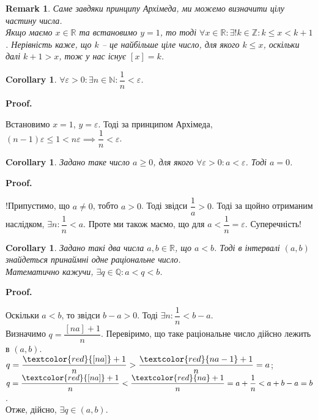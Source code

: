\documentclass[a4paper, 14pt]{article}
\makeatletter
\def\qed{$\blacksquare$}
\theoremstyle{theoremdd}
\theoremstyle{theoremdd}
\theoremstyle{theoremdd}
\theoremstyle{theoremdd}
\theoremstyle{theoremdd}
\theoremstyle{theoremdd}
\newtheorem{remark}[theorem]{Remark}
\theoremstyle{theoremdd}
\theoremstyle{theoremdd}
\newtheorem{corollary}[theorem]{Corollary}
\renewenvironment{proof}[1][Proof.\\]{\par
\pushQED{\hfill \qed}%
\normalfont \topsep6\p@\@plus6\p@\relax
\trivlist
\item\relax
{\bfseries
#1\@addpunct{.}}\hspace\labelsep\ignorespaces
}{%
\popQED\endtrivlist\@endpefalse
}
\makeatother
\begin{document}
	\begin{remark}
	Саме завдяки принципу Архімеда, ми можемо визначити цілу частину числа.\\
	Якщо маємо $x \in \mathbb{R}$ та встановимо $y = 1$, то тоді $\forall x \in \mathbb{R}: \exists !k \in \mathbb{Z}: k \leq x < k+1$. Нерівність каже, що $k$ -- це найбільше ціле число, для якого $k \leq x$, оскільки далі $k+1 > x$, тож у нас існує $[x] = k$.
	\end{remark}
	
	\begin{corollary}
	\label{each_fraction_1_over_n_is_always_less_than_some_positive_number}
	$\forall \varepsilon > 0: \exists n \in \mathbb{N}: \dfrac{1}{n} < \varepsilon$.
	\end{corollary}
	
	\begin{proof}
	Встановимо $x = 1$, $y = \varepsilon$. Тоді за принципом Архімеда, $(n-1)\varepsilon \leq 1 < n\varepsilon \implies \dfrac{1}{n} < \varepsilon$.
	\end{proof}
	
	\begin{corollary}
	Задано таке число $a \geq 0$, для якого $\forall \varepsilon > 0: a < \varepsilon$. Тоді $a = 0$.
	\end{corollary}
	
	\begin{proof}
	!Припустимо, що $a \neq 0$, тобто $a > 0$. Тоді звідси $\dfrac{1}{a} > 0$. Тоді за щойно отриманим наслідком, $\exists n: \dfrac{1}{n} < a$. Проте ми також маємо, що для $a < \dfrac{1}{n} = \varepsilon$. Суперечність!
	\end{proof}
	
	\begin{corollary}
	Задано такі два числа $a,b \in \mathbb{R}$, що $a < b$. Тоді в інтервалі $(a,b)$ знайдеться принаймні одне раціональне число.\\
	Математично кажучи, $\exists q \in \mathbb{Q}: a < q < b$.
	\end{corollary}
	
	\begin{proof}
	Оскільки $a<b$, то звідси $b-a>0$. Тоді $\exists n: \dfrac{1}{n} < b-a$.\\
	Визначимо $q = \dfrac{[na]+1}{n}$. Перевіримо, що таке раціональне число дійсно лежить в $(a,b)$.\\
	$q = \dfrac{\textcolor{red}{[na]}+1}{n} > \dfrac{\textcolor{red}{na-1}+1}{n} = a$;\\
	$q = \dfrac{\textcolor{red}{[na]}+1}{n} < \dfrac{\textcolor{red}{na}+1}{n}= a + \dfrac{1}{n} < a + b - a = b$.\\
	Отже, дійсно, $\exists q \in (a,b)$.
\end{proof}
\end{document}
